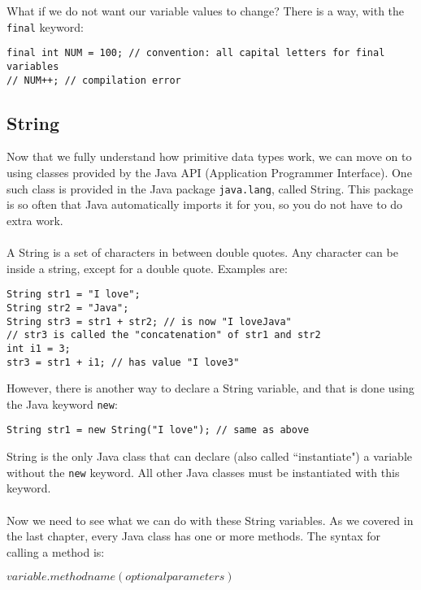 \noindent What if we do not want our variable values to change? There is a way, with the \verb|final| keyword:
\begin{lstlisting}
final int NUM = 100; // convention: all capital letters for final variables
// NUM++; // compilation error
\end{lstlisting}

\subsection{String}
Now that we fully understand how primitive data types work, we can move on to using classes provided by the Java API (Application Programmer Interface). One such class is provided in the Java package \verb|java.lang|, called String. This package is so often that Java automatically imports it for you, so you do not have to do extra work.
\\ \\
A String is a set of characters in between double quotes. Any character can be inside a string, except for a double quote. Examples are:
\begin{lstlisting}
String str1 = "I love";
String str2 = "Java";
String str3 = str1 + str2; // is now "I loveJava"
// str3 is called the "concatenation" of str1 and str2
int i1 = 3;
str3 = str1 + i1; // has value "I love3"
\end{lstlisting}

\noindent However, there is another way to declare a String variable, and that is done using the Java keyword \verb|new|:
\begin{lstlisting}
String str1 = new String("I love"); // same as above
\end{lstlisting}

\noindent String is the only Java class that can declare (also called ``instantiate") a variable without the \verb|new| keyword. All other Java classes must be instantiated with this keyword.
\\ \\
Now we need to see what we can do with these String variables. As we covered in the last chapter, every Java class has one or more methods. The syntax for calling a method is:

\begin{center}
$variable.methodname(optional parameters)$
\end{center}

